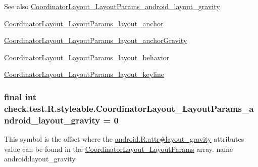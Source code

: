 \begin{DoxySeeAlso}{See also}
\hyperlink{classcheck_1_1test_1_1_r_1_1styleable_a0b7c3eda13b614a196a08848298a893f}{Coordinator\+Layout\+\_\+\+Layout\+Params\+\_\+android\+\_\+layout\+\_\+gravity} 

\hyperlink{classcheck_1_1test_1_1_r_1_1styleable_a8e01daeccfb5aa2fea37a64ec5b7fb3f}{Coordinator\+Layout\+\_\+\+Layout\+Params\+\_\+layout\+\_\+anchor} 

\hyperlink{classcheck_1_1test_1_1_r_1_1styleable_a5b244cd9e2a37484e7cf43272ca1e0f7}{Coordinator\+Layout\+\_\+\+Layout\+Params\+\_\+layout\+\_\+anchor\+Gravity} 

\hyperlink{classcheck_1_1test_1_1_r_1_1styleable_ae9db473c28ded0bb6dcf42e3c26445a1}{Coordinator\+Layout\+\_\+\+Layout\+Params\+\_\+layout\+\_\+behavior} 

\hyperlink{classcheck_1_1test_1_1_r_1_1styleable_a4dd7ccd864a6f3ecf1b6734fb54a58ff}{Coordinator\+Layout\+\_\+\+Layout\+Params\+\_\+layout\+\_\+keyline} 
\end{DoxySeeAlso}
\hypertarget{classcheck_1_1test_1_1_r_1_1styleable_a0b7c3eda13b614a196a08848298a893f}{}
\subsubsection[{Coordinator\+Layout\+\_\+\+Layout\+Params\+\_\+android\+\_\+layout\+\_\+gravity}]{\setlength{\rightskip}{0pt plus 5cm}final int check.\+test.\+R.\+styleable.\+Coordinator\+Layout\+\_\+\+Layout\+Params\+\_\+android\+\_\+layout\+\_\+gravity = 0\hspace{0.3cm}{\ttfamily [static]}}\label{classcheck_1_1test_1_1_r_1_1styleable_a0b7c3eda13b614a196a08848298a893f}
This symbol is the offset where the \hyperlink{}{android.\+R.\+attr\#layout\+\_\+gravity} attribute\textquotesingle{}s value can be found in the \hyperlink{classcheck_1_1test_1_1_r_1_1styleable_a9873c4709aad91a176af799873edc422}{Coordinator\+Layout\+\_\+\+Layout\+Params} array.  name android\+:layout\+\_\+gravity \hypertarget{classcheck_1_1test_1_1_r_1_1styleable_a8e01daeccfb5aa2fea37a64ec5b7fb3f}{}
